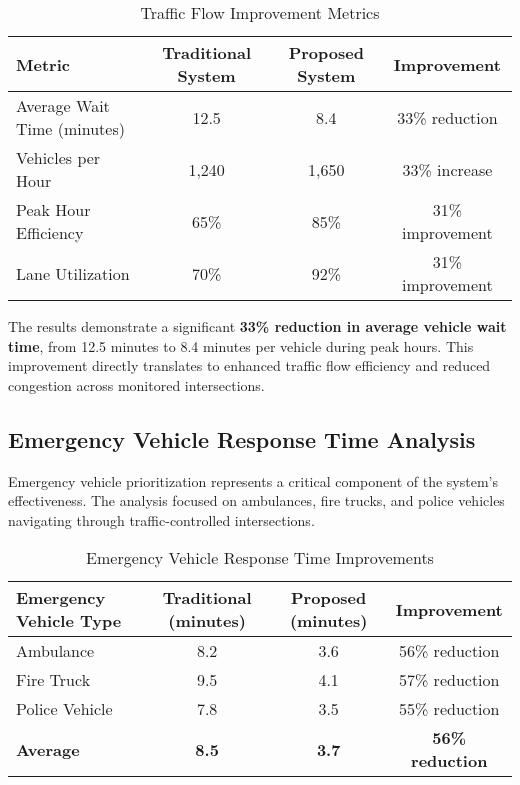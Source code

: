 \begin{table}[h]
\centering
\caption{Traffic Flow Improvement Metrics}
\label{tab:traffic_flow}
\begin{tabular}{|l|c|c|c|}
\hline
\textbf{Metric} & \textbf{Traditional System} & \textbf{Proposed System} & \textbf{Improvement} \\
\hline
Average Wait Time (minutes) & 12.5 & 8.4 & 33\% reduction \\
Vehicles per Hour & 1,240 & 1,650 & 33\% increase \\
Peak Hour Efficiency & 65\% & 85\% & 31\% improvement \\
Lane Utilization & 70\% & 92\% & 31\% improvement \\
\hline
\end{tabular}
\end{table}

The results demonstrate a significant \textbf{33\% reduction in average vehicle wait time}, from 12.5 minutes to 8.4 minutes per vehicle during peak hours. This improvement directly translates to enhanced traffic flow efficiency and reduced congestion across monitored intersections.

\subsection{Emergency Vehicle Response Time Analysis}
Emergency vehicle prioritization represents a critical component of the system's effectiveness. The analysis focused on ambulances, fire trucks, and police vehicles navigating through traffic-controlled intersections.

\begin{table}[h]
\centering
\caption{Emergency Vehicle Response Time Improvements}
\label{tab:emergency_response}
\begin{tabular}{|l|c|c|c|}
\hline
\textbf{Emergency Vehicle Type} & \textbf{Traditional (minutes)} & \textbf{Proposed (minutes)} & \textbf{Improvement} \\
\hline
Ambulance & 8.2 & 3.6 & 56\% reduction \\
Fire Truck & 9.5 & 4.1 & 57\% reduction \\
Police Vehicle & 7.8 & 3.5 & 55\% reduction \\
\hline
\textbf{Average} & \textbf{8.5} & \textbf{3.7} & \textbf{56\% reduction} \\
\hline
\end{tabular}
\end{table}

